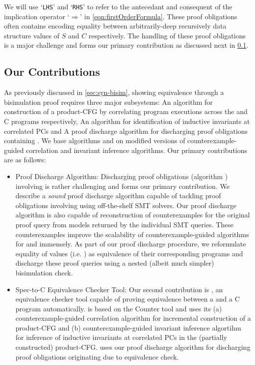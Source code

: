 We will use `{\tt LHS}' and `{\tt RHS}' to refer to the antecedant and consequent of the
implication operator `$\Rightarrow$' in \cref{eqn:firstOrderFormula}.
These proof obligations often contains \recursiveRelations{} encoding equality between
arbitrarily-deep recursively data structure values of $S$ and $C$ respectively.
The handling of these proof obligations is a major challenge and forms our primary
contribution as discussed next in \cref{sec:syn-contribs}.

\subsection{Our Contributions}
\label{sec:syn-contribs}
As previously discussed in \cref{sec:syn-bisim}, showing equivalence through a bisimulation proof
requires three major subsystems:
 An algorithm for construction of a product-CFG by correlating
program executions across the \SpecL{} and C programs respectively,
 An algorithm for identification of inductive invariants at correlated PCs and
 A proof discharge algorithm for discharging proof obligations containing \recursiveRelations{}.
We base algorithms  and  on modified versions of counterexample-guided correlation
and invariant inference algorithms\cite{oopsla20}. Our primary contributions are as follows:

\begin{itemize}
\item Proof Discharge Algorithm: Discharging proof obligations (algorithm )
involving \recursiveRelations{} is rather challenging and forms our primary contribution.
We describe a {\em sound} proof discharge algorithm capable of tackling proof obligations involving
\recursiveRelations{} using off-the-shelf SMT solvers. Our proof discharge algorithm is also capable of
reconstruction of counterexamples for the original proof query from models returned by the individual SMT queries.
These counterexamples improve the scalability of counterexample-guided algorithms for
 and  immensely. As part of our proof discharge procedure,
we reformulate equality of values (i.e. \recursiveRelations{}) as equivalence of their corresponding programs
and discharge these proof queries using a nested (albeit much simpler) bisimulation check.

\item Spec-to-C Equivalence Checker Tool: Our second contribution is \toolName{}, an equivalence checker tool
capable of proving equivalence between a \SpecL{} and a C program automatically. \toolName{} is based on
the Counter tool\cite{oopsla20} and uses its (a) counterexample-guided correlation algorithm for
incremental construction of a product-CFG and (b) counterexample-guided invariant inference algortihm
for inference of inductive invariants at correlated PCs in the (partially constructed) product-CFG.
\toolName{} uses our proof discharge algorithm for discharging proof obligations originating
due to equivalence check.
\end{itemize}

